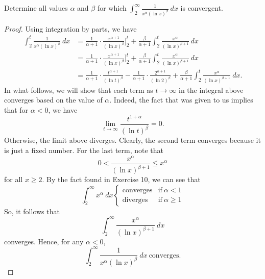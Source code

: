 \documentclass[a4paper]{article}
\begin{document}
\begin{problem}
    Determine all values \( \alpha  \) and \( \beta  \) for which \( \int_{ 2 }^{ \infty  }  \frac{ 1 }{ x^{\alpha} (\ln x)^{\beta} }  \ dx \) is convergent.
\end{problem}
\begin{proof}
    Using integration by parts, we have
    \begin{align*}
    \int_{ 2 }^{ t }  \frac{ 1 }{ x^{\alpha} (\ln x )^{\beta} }  \ dx &= \frac{ 1 }{ \alpha + 1  }  \cdot \frac{ x^{\alpha + 1 } }{  (\ln x )^{\beta} } \Big]_{2}^{t} + \frac{ \beta  }{ \alpha + 1  } \int_{ 2  }^{  t  }  \frac{ x^{\alpha} }{ (\ln x)^{\beta + 1} }  \ dx  \\    
                                                                      &= \frac{ 1 }{ \alpha + 1  }  \cdot \frac{ x^{\alpha + 1 } }{  (\ln x )^{\beta} } \Big]_{2}^{t} + \frac{ \beta  }{ \alpha + 1  } \int_{ 2  }^{  t  }  \frac{ x^{\alpha} }{ (\ln x)^{\beta + 1} }  \ dx  \\
                                                                      &= \frac{ 1 }{ \alpha + 1  }  \cdot \frac{ t^{\alpha + 1} }{ (\ln t)^{\beta} }  - \frac{ 1 }{ \alpha + 1  }  \cdot \frac{ 2^{\alpha + 1} }{ (\ln 2)^{\beta} }  + \frac{ \beta  }{ \alpha + 1 } \int_{ 2 }^{ t }  \frac{ x^{\alpha} }{ (\ln x)^{\beta + 1} }  \ dx. 
    \end{align*}
    In what follows, we will show that each term as \( t \to \infty   \) in the integral above converges based on the value of \( \alpha \). Indeed, the fact that was given to us implies that for \( \alpha < 0  \), we have
    \[  \lim_{ t \to \infty  }  \frac{ t^{1 + \alpha} }{ (\ln t)^{\beta} } = 0.  \]
    Otherwise, the limit above diverges. Clearly, the second term converges because it is just a fixed number. For the last term, note that 
    \[  0 < \frac{ x^{\alpha } }{ (\ln x )^{\beta + 1} } \leq x^{\alpha} \]
    for all \( x \geq 2  \).
    By the fact found in Exercise 10, we can see that  
    \[ \int_{ 2 }^{ \infty  }  x^{\alpha} \ dx \begin{cases}
        \text{converges} &\text{if} \ \alpha < 1  \\
        \text{diverges} &\text{if} \  \alpha \geq 1 
    \end{cases}  \]
    So, it follows that
    \[  \int_{ 2 }^{ \infty  } \frac{ x^{\alpha} }{ (\ln x)^{\beta + 1} }    \ dx \]
    converges. Hence, for any \( \alpha < 0  \), 
    \[  \int_{ 2 }^{ \infty  }  \frac{ 1 }{ x^{\alpha} (\ln x)^{\beta} }  \ dx \ \text{converges}. \]

\end{proof}
\end{document}
